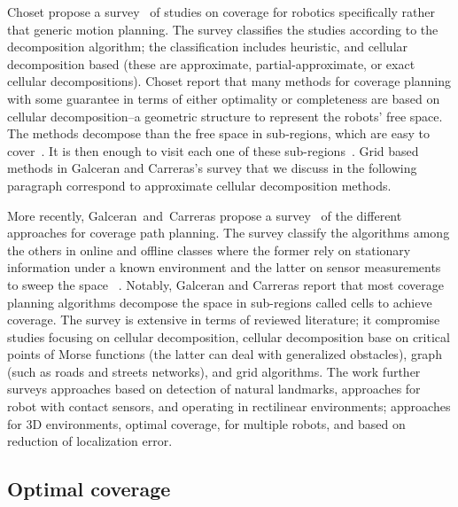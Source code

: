 Choset propose a survey~\citep{choset2001coverage} of studies on coverage for robotics specifically rather that generic motion planning. The survey classifies the studies according to the decomposition algorithm; the classification includes heuristic, and cellular decomposition based (these are approximate, partial-approximate, or exact cellular decompositions). Choset report that many methods for coverage planning with some guarantee in terms of either optimality or completeness are based on cellular decomposition--a geometric structure to represent the robots' free space. The methods decompose than the free space in sub-regions, which are easy to cover~\citep{galceran2013survey}. It is then enough to visit each one of these sub-regions~\citep{galceran2013survey}. Grid based methods in Galceran and Carreras's survey that we discuss in the following paragraph correspond to approximate cellular decomposition methods. 

More recently, Galceran~and~Carreras propose a survey~\citep{galceran2013survey} of the different approaches for coverage path planning. The survey classify the algorithms among the others in online and offline classes where the former rely on stationary information under a known environment and the latter on sensor measurements to sweep the space~\citep{galceran2013survey} . Notably, Galceran and Carreras report that most coverage planning algorithms  decompose the space in sub-regions called cells to achieve coverage. The survey is extensive in terms of reviewed literature; it compromise studies focusing on cellular decomposition, cellular decomposition base on critical points of Morse functions (the latter can deal with generalized obstacles), graph (such as roads and streets networks), and grid algorithms. The work further surveys approaches based on detection of natural landmarks, approaches for robot with contact sensors, and operating in rectilinear environments; approaches for 3D environments, optimal coverage, for multiple robots, and based on reduction of localization error.

\subsection{Optimal coverage}

